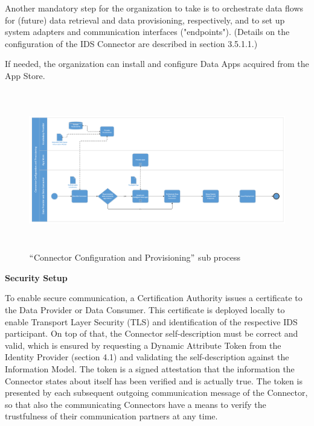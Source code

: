 Another mandatory step for the organization to take is to orchestrate data flows for (future) data retrieval and data provisioning, respectively, and to set up system adapters and communication interfaces ("endpoints"). (Details on the configuration of the IDS Connector are described in section 3.5.1.1.)

If needed, the organization can install and configure Data Apps acquired from the App Store.



\begin{figure}[H]
	\begin{Center}
		\includegraphics[width=6.53in,height=2.74in]{./media/image23.PNG}
		\caption{ $``$Connector Configuration and Provisioning$"$  sub process}
		\label{ fig:_Connector_Configuration_and_Provisioning_sub_process}
	\end{Center}
\end{figure}



\textbf{Security Setup}

To enable secure communication, a Certification Authority issues a certificate to the Data Provider or Data Consumer. This certificate is deployed locally to enable Transport Layer Security (TLS) and identification of the respective IDS participant. On top of that, the Connector self-description must be correct and valid, which is ensured by requesting a Dynamic Attribute Token from the Identity Provider (section 4.1) and validating the self-description against the Information Model. The token is a signed attestation that the information the Connector states about itself has been verified and is actually true. The token is presented by each subsequent outgoing communication message of the Connector, so that also the communicating Connectors have a means to verify the trustfulness of their communication partners at any time.

